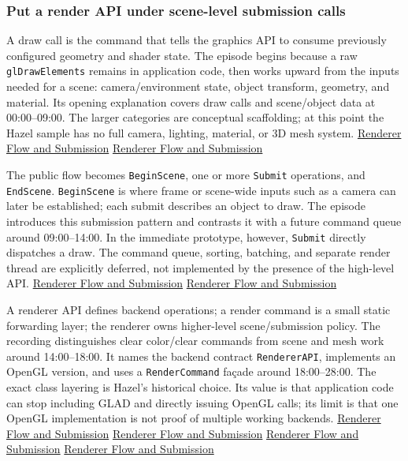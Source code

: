 \subsubsection{Put a render API under scene-level submission calls}\label{put-a-render-api-under-scene-level-submission-calls}

A draw call is the command that tells the graphics API to consume previously configured geometry and shader state. The episode begins because a raw \texttt{glDrawElements} remains in application code, then works upward from the inputs needed for a scene: camera/environment state, object transform, geometry, and material. Its opening explanation covers draw calls and scene/object data at 00:00--09:00. The larger categories are conceptual scaffolding; at this point the Hazel sample has no full camera, lighting, material, or 3D mesh system. \href{https://www.youtube.com/watch?v=akxevYYWd9g&t=0s}{Renderer Flow and Submission} \href{https://www.youtube.com/watch?v=akxevYYWd9g&t=270s}{Renderer Flow and Submission}

The public flow becomes \texttt{BeginScene}, one or more \texttt{Submit} operations, and \texttt{EndScene}. \texttt{BeginScene} is where frame or scene-wide inputs such as a camera can later be established; each submit describes an object to draw. The episode introduces this submission pattern and contrasts it with a future command queue around 09:00--14:00. In the immediate prototype, however, \texttt{Submit} directly dispatches a draw. The command queue, sorting, batching, and separate render thread are explicitly deferred, not implemented by the presence of the high-level API. \href{https://www.youtube.com/watch?v=akxevYYWd9g&t=540s}{Renderer Flow and Submission} \href{https://www.youtube.com/watch?v=akxevYYWd9g&t=720s}{Renderer Flow and Submission}

A renderer API defines backend operations; a render command is a small static forwarding layer; the renderer owns higher-level scene/submission policy. The recording distinguishes clear color/clear commands from scene and mesh work around 14:00--18:00. It names the backend contract \texttt{RendererAPI}, implements an OpenGL version, and uses a \texttt{RenderCommand} façade around 18:00--28:00. The exact class layering is Hazel's historical choice. Its value is that application code can stop including GLAD and directly issuing OpenGL calls; its limit is that one OpenGL implementation is not proof of multiple working backends. \href{https://www.youtube.com/watch?v=akxevYYWd9g&t=840s}{Renderer Flow and Submission} \href{https://www.youtube.com/watch?v=akxevYYWd9g&t=1080s}{Renderer Flow and Submission} \href{https://www.youtube.com/watch?v=akxevYYWd9g&t=1380s}{Renderer Flow and Submission} \href{https://www.youtube.com/watch?v=akxevYYWd9g&t=1560s}{Renderer Flow and Submission}

